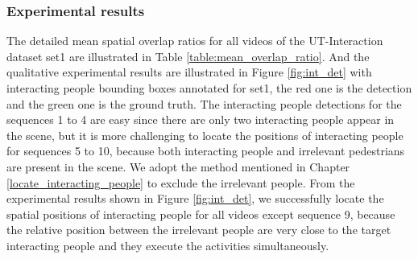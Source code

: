 \subsubsection*{Experimental results}
The detailed mean spatial overlap ratios for all videos of the UT-Interaction dataset set1 are illustrated in Table \ref{table:mean_overlap_ratio}. And the qualitative experimental results are illustrated in Figure \ref{fig:int_det} with interacting people bounding boxes annotated for set1, the red one is the detection and the green one is the ground truth. The interacting people detections for the sequences 1 to 4 are easy since there are only two interacting people appear in the scene, but it is more challenging to locate the positions of interacting people for sequences 5 to 10, because both interacting people and irrelevant pedestrians are present in the scene. We adopt the method mentioned in Chapter \ref{locate_interacting_people} to exclude the irrelevant people. From the experimental results shown in Figure \ref{fig:int_det}, we successfully locate the spatial positions of interacting people for all videos except sequence 9, because the relative position between the irrelevant people are very close to the target interacting people and they execute the activities simultaneously. 
